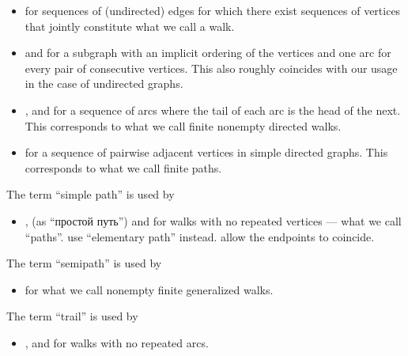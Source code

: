 \begin{remark}
\begin{thmenum}
\begin{itemize}
      \item {} for sequences of (undirected) edges for which there exist sequences of vertices that jointly constitute what we call a walk.

      \item {} and  for a subgraph with an implicit ordering of the vertices and one arc for every pair of consecutive vertices. This also roughly coincides with our usage in the case of undirected graphs.

      \item {},  and  for a sequence of arcs where the tail of each arc is the head of the next. This corresponds to what we call finite nonempty directed walks.

      \item {} for a sequence of pairwise adjacent vertices in simple directed graphs. This corresponds to what we call finite paths.
    \end{itemize}

     The term \enquote{simple path} is used by
    \begin{itemize}
      \item {},  (as \enquote{простой путь}) and  for walks with no repeated vertices --- what we call \enquote{paths}.  use \enquote{elementary path} instead.  allow the endpoints to coincide.
    \end{itemize}

     The term \enquote{semipath} is used by
    \begin{itemize}
      \item {} for what we call nonempty finite generalized walks.
    \end{itemize}

     The term \enquote{trail} is used by
    \begin{itemize}
      \item {},  and  for walks with no repeated arcs.
    \end{itemize}


\end{thmenum}
\end{remark}
